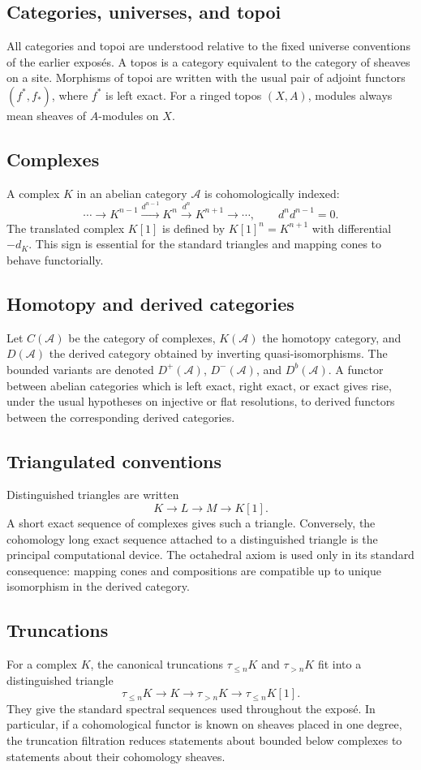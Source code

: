 \documentclass[12pt]{article}
\newcommand{\A}{\mathcal{A}}
\begin{document}
\subsection{Categories, universes, and topoi}
All categories and topoi are understood relative to the fixed universe conventions of the earlier expos\'es. A topos is a category equivalent to the category of sheaves on a site. Morphisms of topoi are written with the usual pair of adjoint functors \((f^*,f_*)\), where \(f^*\) is left exact. For a ringed topos \((X,A)\), modules always mean sheaves of \(A\)-modules on \(X\).

\subsection{Complexes}
A complex \(K\) in an abelian category \(\A\) is cohomologically indexed:
\[
\cdots\to K^{n-1}\xrightarrow{d^{n-1}}K^n\xrightarrow{d^n}K^{n+1}\to\cdots,
\qquad d^{n}d^{n-1}=0.
\]
The translated complex \(K[1]\) is defined by \(K[1]^n=K^{n+1}\) with differential \(-d_K\). This sign is essential for the standard triangles and mapping cones to behave functorially.

\subsection{Homotopy and derived categories}
Let \(C(\A)\) be the category of complexes, \(K(\A)\) the homotopy category, and \(D(\A)\) the derived category obtained by inverting quasi-isomorphisms. The bounded variants are denoted \(D^+(\A)\), \(D^-(\A)\), and \(D^b(\A)\). A functor between abelian categories which is left exact, right exact, or exact gives rise, under the usual hypotheses on injective or flat resolutions, to derived functors between the corresponding derived categories.

\subsection{Triangulated conventions}
Distinguished triangles are written
\[
K\longrightarrow L\longrightarrow M\longrightarrow K[1].
\]
A short exact sequence of complexes gives such a triangle. Conversely, the cohomology long exact sequence attached to a distinguished triangle is the principal computational device. The octahedral axiom is used only in its standard consequence: mapping cones and compositions are compatible up to unique isomorphism in the derived category.

\subsection{Truncations}
For a complex \(K\), the canonical truncations \(\tau_{\le n}K\) and \(\tau_{>n}K\) fit into a distinguished triangle
\[
\tau_{\le n}K\to K\to \tau_{>n}K\to \tau_{\le n}K[1].
\]
They give the standard spectral sequences used throughout the expos\'e. In particular, if a cohomological functor is known on sheaves placed in one degree, the truncation filtration reduces statements about bounded below complexes to statements about their cohomology sheaves.
\end{document}
